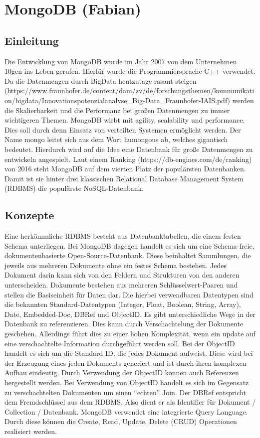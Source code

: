 \chapter{MongoDB (Fabian)}\label{mongodb-fabian}

\section{Einleitung}\label{einleitung}

Die Entwicklung von MongoDB wurde im Jahr 2007 von dem Unternehmen 10gen
ins Leben gerufen. Hierfür wurde die Programmiersprache C++ verwendet.
Da die Datenmengen durch BigData heutzutage rasant steigen
(https://www.fraunhofer.de/content/dam/zv/de/forschungsthemen/kommunikation/bigdata/Innovationspotenzialanalyse\_Big-Data\_Fraunhofer-IAIS.pdf)
werden die Skalierbarkeit und die Performanz bei großen Datenmengen zu
immer wichtigeren Themen. MongoDB wirbt mit agility, scalability und
performance. Dies soll durch denn Einsatz von verteilten Systemen
ermöglicht werden. Der Name mongo leitet sich aus dem Wort humongous ab,
welches gigantisch bedeutet. Hierdurch wird auf die Idee eine Datenbank
für große Datenmengen zu entwickeln angespielt. Laut einem Ranking
(https://db-engines.com/de/ranking) von 2016 steht MongoDB auf dem
vierten Platz der populärsten Datenbanken. Damit ist sie hinter drei
klassischen Relational Database Management System (RDBMS) die populärste
NoSQL-Datenbank.

\section{Konzepte}\label{konzepte}

Eine herkömmliche RDBMS besteht aus Datenbanktabellen, die einem festen
Schema unterliegen. Bei MongoDB dagegen handelt es sich um eine
Schema-freie, dokumentenbasierte Open-Source-Datenbank. Diese beinhaltet
Sammlungen, die jeweils aus mehreren Dokumente ohne ein festes Schema
bestehen. Jedes Dokument darin kann sich von den Feldern und Strukturen
von den anderen unterscheiden. Dokumente bestehen aus mehreren
Schlüsselwert-Paaren und stellen die Basiseinheit für Daten dar. Die
hierbei verwendbaren Datentypen sind die bekannten Standard-Datentypen
(Integer, Float, Boolean, String, Array), Date, Embedded-Doc, DBRef und
ObjectID. Es gibt unterschiedliche Wege in der Datenbank zu
referenzieren. Dies kann durch Verschachtelung der Dokumente geschehen.
Allerdings führt dies zu einer hohen Komplexität, wenn ein update auf
eine verschachtelte Information durchgeführt werden soll. Bei der
ObjectID handelt es sich um die Standard ID, die jedes Dokument
aufweist. Diese wird bei der Erzeugung eines jeden Dokuments generiert
und ist durch ihren komplexen Aufbau eindeutig. Durch Verwendung der
ObjectID können auch Referenzen hergestellt werden. Bei Verwendung von
ObjectID handelt es sich im Gegensatz zu verschachtelten Dokumenten um
einen ``echten'' Join. Der DBRef entspricht dem Fremdschlüssel aus dem
RDBMS. Also dient er als Identifier für Dokument / Collection /
Datenbank. MongoDB verwendet eine integrierte Query Language. Durch
diese können die Create, Read, Update, Delete (CRUD) Operationen
realisiert werden.

